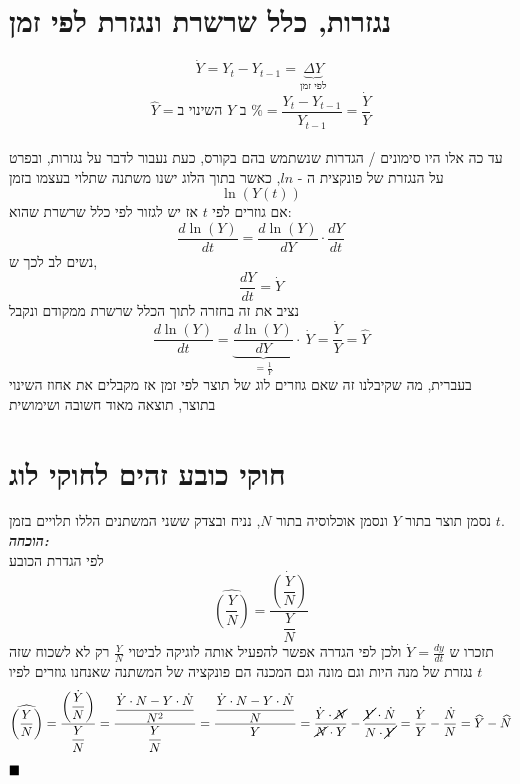 \documentclass[a4paper,12pt]{article}
\renewcommand{\qed}{\hfill\blacksquare}
\begin{document}
\begin{RTL}
\begin{hebrew}
\section{נגזרות, כלל שרשרת ונגזרת לפי זמן}
\begin{equation*}
    \dot Y = Y_t - Y_{t-1 } = \underbrace{\Delta Y}_{\text{לפי זמן}}
\end{equation*}
\begin{equation*}
    \hat Y = \text{השינוי ב $Y$  ב \%} = \frac{Y_t - Y_{t-1}}{Y_{t-1}} = \frac{\dot Y}{Y}
\end{equation*}
\\
עד כה אלו היו סימונים / הגדרות שנשתמש בהם בקורס, כעת נעבור לדבר על נגזרות, ובפרט על הנגזרת של פונקצית 
 ה - $ln$, כאשר בתוך הלוג ישנו משתנה שתלוי בעצמו בזמן
\begin{equation*}
    \ln (Y(t))
\end{equation*}
אם גוזרים לפי $t$ אז יש לגזור לפי כלל שרשרת שהוא:
\begin{equation*}
\frac{d \ln (Y)}{dt} = \frac{d \ln (Y)}{dY} \cdot \frac{dY}{dt}
\end{equation*}
נשים לב לכך ש,
\begin{equation*}
    \frac{dY}{dt} = \dot Y
\end{equation*}
נציב את זה בחזרה לתוך הכלל שרשרת ממקודם ונקבל 
\begin{equation*}
    \frac{d \ln (Y)}{dt} =\underbrace{ \frac{d \ln (Y)}{dY}}_{ = \frac{1}{Y}} \cdot \  \dot Y = \frac{\dot Y }{Y} = \hat Y
\end{equation*}
בעברית, מה שקיבלנו זה שאם גוזרים לוג של תוצר לפי זמן אז מקבלים את אחוז השינוי בתוצר, תוצאה מאוד חשובה ושימושית

\section{חוקי כובע זהים לחוקי לוג}
נסמן תוצר בתור $Y$ ונסמן אוכלוסיה בתור $N$, נניח ובצדק ששני המשתנים הללו תלויים בזמן $t$. \\
\textbf{\textit{הוכחה:}} \\
לפי הגדרת הכובע
\begin{equation*}
    \widehat{ \left(\frac{Y}{N}\right)} = \dfrac{\dot{\left(\dfrac{Y}{N}\right)}}{\dfrac{Y}{N}}
\end{equation*}
תזכרו ש $\dot Y = \frac{dy}{dt}$ ולכן לפי הגדרה אפשר להפעיל אותה לוגיקה לביטוי $\frac{Y}{N}$  רק לא לשכוח שזה נגזרת של מנה היות וגם מונה וגם המכנה הם פונקציה של המשתנה שאנחנו גוזרים לפיו $t$
\begin{equation*}
\widehat{\left(\frac{Y}{N}\right)}=\dfrac{\left(\dfrac{\dot{Y}}{N}\right)}{\dfrac{Y}{N}}=\dfrac{\dfrac{\dot{Y} \cdot N-Y \cdot \dot{N}}{N^2}}{\dfrac{Y}{{N}}}=\dfrac{\dfrac{\dot{Y} \cdot N-Y \cdot \dot{N}}{N}}{Y}=\dfrac{\dot{Y} \cdot \cancel{N}}{\cancel{N} \cdot Y}-\dfrac{\cancel{Y} \cdot \dot{N}}{N \cdot \cancel{Y}}=\dfrac{\dot{Y}}{Y}-\dfrac{\dot{N}}{N}=\widehat{Y}-\widehat{N}
\end{equation*}
$\qed$

\end{hebrew}
\end{RTL}
\end{document}
